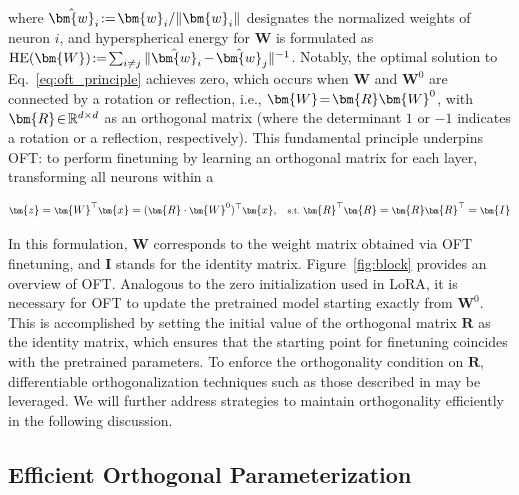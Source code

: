 where $\thickmuskip=2mu \medmuskip=2mu \hat{\bm{w}}_i:=\bm{w}_i/\|\bm{w}_i\|$ designates the normalized weights of neuron $i$, and hyperspherical energy for $\bm{W}$ is formulated as $\thickmuskip=2mu \medmuskip=2mu \text{HE}(\bm{W}):= \sum_{i\neq j} \|\hat{\bm{w}}_i-\hat{\bm{w}}_j\|^{-1}$. Notably, the optimal solution to Eq.~\eqref{eq:oft_principle} achieves zero, which occurs when $\bm{W}$ and $\bm{W}^0$ are connected by a rotation or reflection, i.e., $\thickmuskip=2mu \medmuskip=2mu \bm{W}=\bm{R}\bm{W}^0$, with $\thickmuskip=2mu \medmuskip=2mu \bm{R}\in\mathbb{R}^{d\times d}$ as an orthogonal matrix (where the determinant $1$ or $-1$ indicates a rotation or a reflection, respectively). This fundamental principle underpins OFT: to perform finetuning by learning an orthogonal matrix for each layer, transforming all neurons within a

\begin{equation}\label{eq:oft_general}
    \footnotesize
    \bm{z}=\bm{W}^\top\bm{x}=(\bm{R}\cdot\bm{W}^0)^\top\bm{x},~~~\text{s.t.}~\bm{R}^\top\bm{R}=\bm{R}\bm{R}^\top=\bm{I}
\end{equation}

In this formulation, $\bm{W}$ corresponds to the weight matrix obtained via OFT finetuning, and $\bm{I}$ stands for the identity matrix. Figure~\ref{fig:block} provides an overview of OFT. Analogous to the zero initialization used in LoRA, it is necessary for OFT to update the pretrained model starting exactly from $\bm{W}^0$. This is accomplished by setting the initial value of the orthogonal matrix $\bm{R}$ as the identity matrix, which ensures that the starting point for finetuning coincides with the pretrained parameters. To enforce the orthogonality condition on $\bm{R}$, differentiable orthogonalization techniques such as those described in \cite{liu2021orthogonal,lezcano2019cheap} may be leveraged. We will further address strategies to maintain orthogonality efficiently in the following discussion.

\subsection{Efficient Orthogonal Parameterization}\label{sect:eff_ortho}

